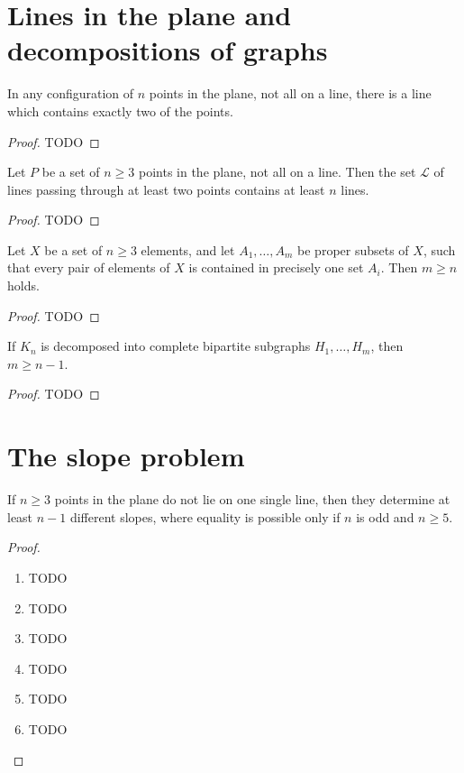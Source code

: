 \chapter{Lines in the plane and decompositions of graphs}

\begin{theorem}
  \label{ch11_theorem1}
  In any configuration of \(n\) points in the plane, not all on a line,
  there is a line which contains exactly two of the points.
\end{theorem}
\begin{proof}
  TODO
\end{proof}

\begin{theorem}
  \label{ch11_theorem2}
  Let \(P\) be a set of \(n\ge 3\) points in the plane, not all on a line.
  Then the set \(\mathcal{L}\) of lines passing through at least two points contains at least
  \(n\) lines.
\end{theorem}
\begin{proof}
  TODO
\end{proof}

\begin{theorem}
  \label{ch11_theorem3}
  Let \(X\) be a set of \(n\ge 3\) elements, and let \(A_1, \dots, A_m\) be
  proper subsets of \(X\), such that every pair of elements of \(X\) is contained in
  precisely one set \(A_i\). Then \(m\ge n\) holds.
\end{theorem}
\begin{proof}
  TODO
\end{proof}

\begin{theorem}
  \label{ch11_theorem4}
  If \(K_n\) is decomposed into complete bipartite subgraphs
  \(H_1, \dots, H_m\), then \(m \ge n - 1\).
\end{theorem}
\begin{proof}
  TODO
\end{proof}


\chapter{The slope problem}

\begin{theorem}
  \label{slope_problem}
  If \(n\ge 3\) points in the plane do not lie on one single line,
  then they determine at least \(n - 1\) different slopes, where equality is
  possible only if \(n\) is odd and \(n \ge 5\).
\end{theorem}
\begin{proof}
  \begin{enumerate}
    \item TODO
    \item TODO
    \item TODO
    \item TODO
    \item TODO
    \item TODO
  \end{enumerate}
\end{proof}


